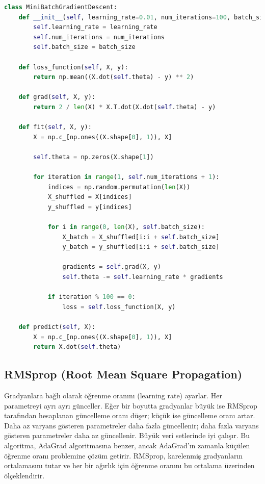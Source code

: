 \begin{lstlisting}[language=Python]
class MiniBatchGradientDescent:
    def __init__(self, learning_rate=0.01, num_iterations=100, batch_size=32):
        self.learning_rate = learning_rate
        self.num_iterations = num_iterations
        self.batch_size = batch_size

    def loss_function(self, X, y):
        return np.mean((X.dot(self.theta) - y) ** 2)
        
    def grad(self, X, y):
        return 2 / len(X) * X.T.dot(X.dot(self.theta) - y)
    
    def fit(self, X, y):
        X = np.c_[np.ones((X.shape[0], 1)), X]

        self.theta = np.zeros(X.shape[1])
        
        for iteration in range(1, self.num_iterations + 1):
            indices = np.random.permutation(len(X))
            X_shuffled = X[indices]
            y_shuffled = y[indices]

            for i in range(0, len(X), self.batch_size):
                X_batch = X_shuffled[i:i + self.batch_size]
                y_batch = y_shuffled[i:i + self.batch_size]

                gradients = self.grad(X, y)
                self.theta -= self.learning_rate * gradients

            if iteration % 100 == 0:
                loss = self.loss_function(X, y)

    def predict(self, X):
        X = np.c_[np.ones((X.shape[0], 1)), X]
        return X.dot(self.theta)
\end{lstlisting}

\newpage

\subsection{RMSprop (Root Mean Square Propagation)}
Gradyanlara bağlı olarak öğrenme oranını (learning rate) ayarlar. Her parametreyi ayrı ayrı günceller. Eğer bir boyutta gradyanlar büyük ise RMSprop tarafından hesaplanan güncelleme oranı düşer; küçük ise güncelleme oranı artar. Daha az varyans gösteren parametreler daha fazla güncellenir; daha fazla varyans gösteren parametreler daha az güncellenir. Büyük veri setlerinde iyi çalışır. Bu algoritma, AdaGrad algoritmasına benzer, ancak AdaGrad'ın zamanla küçülen öğrenme oranı problemine çözüm getirir. RMSprop, karelenmiş gradyanların ortalamasını tutar ve her bir ağırlık için öğrenme oranını bu ortalama üzerinden ölçeklendirir.

